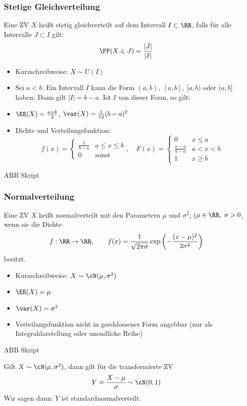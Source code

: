 \subsubsection{Stetige Gleichverteilung}
 Eine ZV $X$ heißt stetig gleichverteilt auf dem Intervall $I\subset \RR$, falls für alle Intervalle $J \subset I$ gilt:
$$\PP(X\in J)=\frac{|J|}{|I|}$$
\begin{itemize}
\item Kurzschreibweise: $X \sim U(I)$
\item Sei $a<b$. Ein Intervall $I$ kann die Form $(a,b),\;[a,b],\;[a,b)$ oder $(a,b]$ haben. Dann gilt $|I|=b-a$. Ist $I$ von dieser Form, so gilt:
\item $\EE(X)=\frac{a+b}{2}$, $\var(X)=\frac{1}{12}(b-a)^2$
\item Dichte und Verteilungsfunktion:
$$f(x)=\begin{cases}
\frac{1}{b-a} & a\leq x \leq b\\
0 & \mathrm{sonst}
\end{cases}, \quad F(x)=\begin{cases}
0 & x \leq a\\
\frac{x-a}{b-a} & a<x<b\\
1 & x \geq b
\end{cases}$$
\end{itemize}
ABB Skript
\subsubsection{Normalverteilung}
 Eine ZV $X$ heißt normalverteilt mit den Parametern $\mu$ und $\sigma^2$, ($\mu \in \RR, \; \sigma > 0$, wenn sie die Dichte\\
$$f: \RR\to \RR, \qquad f(x)=\frac{1}{\sqrt{2\pi\sigma}}\exp\left(-\frac{(x-\mu)^2}{2\sigma^2}\right)$$
besitzt.

\begin{itemize}
\item Kurzschreibweise: $X\sim \cN(\mu, \sigma^2)$
\item $\EE(X)=\mu$
\item $\var(X) = \sigma^2$
\item Verteilungsfunktion nicht in geschlossener Form angebbar (nur als Integraldarstellung oder unendliche Reihe)
\end{itemize}
ABB Skript

 Gilt $X\sim \cN(\mu, \sigma^2)$, dann gilt für die transformierte ZV
$$Y=\frac{X-\mu}{\sigma} \sim \cN (0,1)$$
Wir sagen dann: $Y$ ist standardnormalverteilt.

